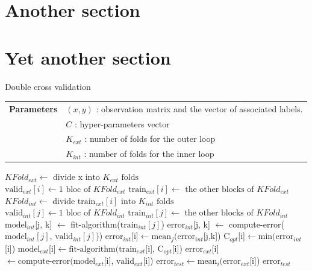 \documentclass[a4paper,12pt,oneside,final]{report}
\begin{document}
\paragraph{}
\section{Another section}
\section{Yet another section}

\paragraph{}

\begin{algorithm}[H]
     \caption{\small Double cross validation}
     \label{alg:double_cross_val} 
     \begin{algorithmic}
       \STATE \begin{tabular}{@{\hspace{0cm}}p{1.4cm}l}
       \textbf{Parameters}  & $(x, y)$ : observation matrix and the vector of associated labels.\\
           & $C$ : hyper-parameters vector\\
           & $K_{ext}$ : number of folds for the outer loop\\
           & $K_{int}$ : number of folds for the inner loop\\
       \end{tabular}
       \STATE $KFold_{ext} \leftarrow \text{ divide x into } K_{ext} \text{ folds}$\\
         \STATE $\text{valid}_{ext}[i] \leftarrow 1 \text{ bloc of } KFold_{ext}$
         \STATE $\text{train}_{ext}[i] \leftarrow \text{ the other blocks of } KFold_{ext}$
         \STATE $KFold_{int} \leftarrow \text{ divide train}_{ext}[i] \text{ into } K_{int} \text{ folds}$\\
            \STATE $\text{valid}_{int}[j] \leftarrow 1 \text{ bloc of } KFold_{int}$
            \STATE $\text{train}_{int}[j] \leftarrow \text{ the other blocks of } KFold_{int}$
               \STATE $\text{model}_{int}$[j, k] $\leftarrow$ fit-algorithm($\text{train}_{int}[j]$)
               \STATE $\text{error}_{int}$[j, k] $\leftarrow$ compute-error($\text{model}_{int}[j]$, $\text{valid}_{int}[j]$))
            \ENDFOR
         \ENDFOR
         \STATE $\text{error}_{int}$[i]$ \leftarrow  \text{mean}_j( \text{error}_{int}$[j,k])
         \STATE $\text{C}_{opt}$[i]$     \leftarrow  \text{min}( \text{error}_{int}$[i])
         \STATE $\text{model}_{ext}$[i]$ \leftarrow  \text{fit-algorithm}( \text{train}_{ext}$[i], $\text{C}_{opt}$[i])
         \STATE $\text{error}_{ext}$[i]$ \leftarrow  \text{compute-error}( \text{model}_{ext}$[i], $\text{valid}_{ext}$[i])
     \ENDFOR 
     \STATE $\text{error}_{test} \leftarrow  \text{mean}_i( \text{error}_{ext}$[i])
     \RETURN $\text{error}_{test}$ 
     \end{algorithmic}
   \end{algorithm}
\end{document}
